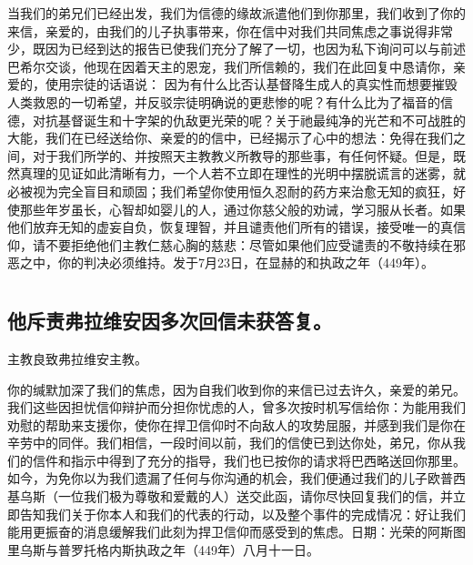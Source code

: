 当我们的弟兄们已经出发，我们为信德的缘故派遣他们到你那里，我们收到了你的来信，亲爱的，由我们的儿子执事带来，你在信中对我们共同焦虑之事说得非常少，既因为已经到达的报告已使我们充分了解了一切，也因为私下询问可以与前述巴希尔交谈，他现在因着天主的恩宠，我们所信赖的，我们在此回复中恳请你，亲爱的，使用宗徒的话语说： 因为有什么比否认基督降生成人的真实性而想要摧毁人类救恩的一切希望，并反驳宗徒明确说的更悲惨的呢？有什么比为了福音的信德，对抗基督诞生和十字架的仇敌更光荣的呢？关于祂最纯净的光芒和不可战胜的大能，我们在已经送给你、亲爱的的信中，已经揭示了心中的想法：免得在我们之间，对于我们所学的、并按照天主教教义所教导的那些事，有任何怀疑。但是，既然真理的见证如此清晰有力，一个人若不立即在理性的光明中摆脱谎言的迷雾，就必被视为完全盲目和顽固；我们希望你使用恒久忍耐的药方来治愈无知的疯狂，好使那些年岁虽长，心智却如婴儿的人，通过你慈父般的劝诫，学习服从长者。如果他们放弃无知的虚妄自负，恢复理智，并且谴责他们所有的错误，接受唯一的真信仰，请不要拒绝他们主教仁慈心胸的慈悲：尽管如果他们应受谴责的不敬持续在邪恶之中，你的判决必须维持。发于7月23日，在显赫的和执政之年（449年）。\par



\section{}


\subsection{他斥责弗拉维安因多次回信未获答复。}

主教良致弗拉维安主教。\par

你的缄默加深了我们的焦虑，因为自我们收到你的来信已过去许久，亲爱的弟兄。我们这些因担忧信仰辩护而分担你忧虑的人，曾多次按时机写信给你：为能用我们劝慰的帮助来支援你，使你在捍卫信仰时不向敌人的攻势屈服，并感到我们是你在辛劳中的同伴。我们相信，一段时间以前，我们的信使已到达你处，弟兄，你从我们的信件和指示中得到了充分的指导，我们也已按你的请求将巴西略送回你那里。如今，为免你以为我们遗漏了任何与你沟通的机会，我们便通过我们的儿子欧普西基乌斯（一位我们极为尊敬和爱戴的人）送交此函，请你尽快回复我们的信，并立即告知我们关于你本人和我们的代表的行动，以及整个事件的完成情况：好让我们能用更振奋的消息缓解我们此刻为捍卫信仰而感受到的焦虑。日期：光荣的阿斯图里乌斯与普罗托格内斯执政之年（449年）八月十一日。\newline{}\par

